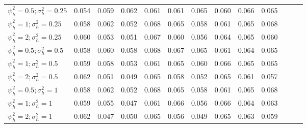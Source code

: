 \documentclass[AMA,STIX1COL,]{WileyNJD-v2}
\begin{document}
\begin{table}[ht]
{\begin{tabular}{l c c c c c c c c c c c c}
\hline
$\psi_h^2 = 0.5; \sigma_h^2 = 0.25$ & 0.054 & 0.059 & 0.062 & 0.061 & 0.061 & 0.065 & 0.060 & 0.066 & 0.065 \\
$\psi_h^2 = 1; \sigma_h^2 = 0.25$ & 0.058 & 0.062 & 0.052 & 0.068 & 0.065 & 0.058 & 0.061 & 0.065 & 0.068 \\
$\psi_h^2 = 2; \sigma_h^2 = 0.25$ & 0.060 & 0.053 & 0.051 & 0.067 & 0.060 & 0.056 & 0.064 & 0.065 & 0.060 \\
$\psi_h^2 = 0.5; \sigma_h^2 = 0.5$ & 0.058 & 0.060 & 0.058 & 0.068 & 0.067 & 0.065 & 0.061 & 0.064 & 0.065 \\
$\psi_h^2 = 1; \sigma_h^2 = 0.5$ & 0.059 & 0.058 & 0.053 & 0.061 & 0.065 & 0.060 & 0.066 & 0.065 & 0.065 \\
$\psi_h^2 = 2; \sigma_h^2 = 0.5$ & 0.062 & 0.051 & 0.049 & 0.065 & 0.058 & 0.052 & 0.065 & 0.061 & 0.057 \\
$\psi_h^2 = 0.5; \sigma_h^2 = 1$ & 0.058 & 0.062 & 0.052 & 0.068 & 0.065 & 0.058 & 0.061 & 0.065 & 0.068 \\
$\psi_h^2 = 1; \sigma_h^2 = 1$ & 0.059 & 0.055 & 0.047 & 0.061 & 0.066 & 0.056 & 0.066 & 0.064 & 0.063 \\
$\psi_h^2 = 2; \sigma_h^2 = 1$ & 0.062 & 0.047 & 0.050 & 0.065 & 0.056 & 0.049 & 0.065 & 0.063 & 0.059 \\
\bottomrule
\end{tabular}}
\end{table}
\end{document}
